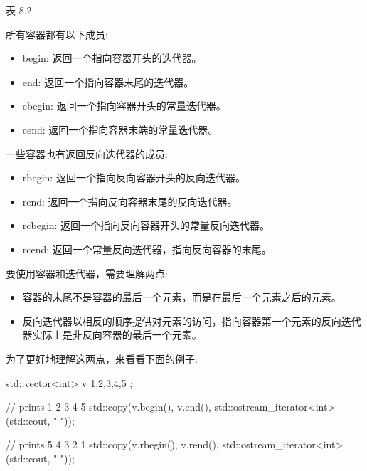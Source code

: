 \begin{center}
表 8.2
\end{center}

所有容器都有以下成员:

\begin{itemize}
\item
begin: 返回一个指向容器开头的迭代器。

\item
end: 返回一个指向容器末尾的迭代器。

\item
cbegin: 返回一个指向容器开头的常量迭代器。

\item
cend: 返回一个指向容器末端的常量迭代器。
\end{itemize}

一些容器也有返回反向迭代器的成员:

\begin{itemize}
\item
rbegin: 返回一个指向反向容器开头的反向迭代器。

\item
rend: 返回一个指向反向容器末尾的反向迭代器。

\item
rcbegin: 返回一个指向反向容器开头的常量反向迭代器。

\item
rcend: 返回一个常量反向迭代器，指向反向容器的末尾。
\end{itemize}

要使用容器和迭代器，需要理解两点:

\begin{itemize}
\item
容器的末尾不是容器的最后一个元素，而是在最后一个元素之后的元素。

\item
反向迭代器以相反的顺序提供对元素的访问，指向容器第一个元素的反向迭代器实际上是非反向容器的最后一个元素。
\end{itemize}

为了更好地理解这两点，来看看下面的例子:

\begin{cpp}
std::vector<int> v{ 1,2,3,4,5 };

// prints 1 2 3 4 5
std::copy(v.begin(), v.end(),
		  std::ostream_iterator<int>(std::cout, " "));

// prints 5 4 3 2 1
std::copy(v.rbegin(), v.rend(),
		  std::ostream_iterator<int>(std::cout, " "));
\end{cpp}

